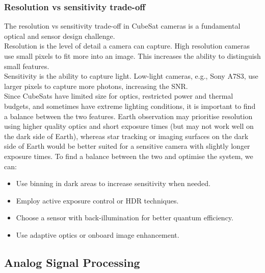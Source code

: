 \subsubsection{Resolution vs sensitivity trade-off}
The resolution vs sensitivity trade-off in CubeSat cameras is a fundamental optical and sensor design challenge.
\\
Resolution is the level of detail a camera can capture. High resolution cameras use small pixels to fit more into an image. This increases the ability to distinguish small features.
\\
Sensitivity is the ability to capture light. Low-light cameras, e.g., Sony A7S3, use larger pixels to capture more photons, increasing the SNR.
\\
Since CubeSats have limited size for optics, restricted power and thermal budgets, and sometimes have extreme lighting conditions, it is important to find a balance between the two features.
Earth observation may prioritise resolution using higher quality optics and short exposure times (but may not work well on the dark side of Earth), whereas star tracking or imaging surfaces on the dark side of Earth would be better suited for a sensitive camera with slightly longer exposure times.
\nl
To find a balance between the two and optimise the system, we can:
\begin{itemize}
    \item Use binning in dark areas to increase sensitivity when needed.
    \item Employ active exposure control or HDR techniques.
    \item Choose a sensor with back-illumination for better quantum efficiency.
    \item Use adaptive optics or onboard image enhancement.
\end{itemize}

\subsection{Analog Signal Processing}

